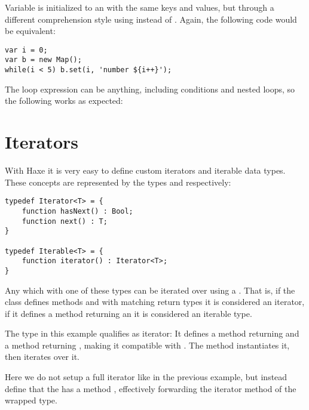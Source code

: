 Variable  is initialized to an  with the same keys and values, but through a different comprehension style using  instead of . Again, the following code would be equivalent:

\begin{lstlisting}
var i = 0;
var b = new Map();
while(i < 5) b.set(i, 'number ${i++}');
\end{lstlisting}

The loop expression can be anything, including conditions and nested loops, so the following works as expected:



\section{Iterators}
\label{lf-iterators}

With Haxe it is very easy to define custom iterators and iterable data types. These concepts are represented by the types  and  respectively:

\begin{lstlisting}
typedef Iterator<T> = {
	function hasNext() : Bool;
	function next() : T;
}

typedef Iterable<T> = {
	function iterator() : Iterator<T>;
}
\end{lstlisting}

Any  which  with one of these types can be iterated over using a . That is, if the class defines methods  and  with matching return types it is considered an iterator, if it defines a method  returning an  it is considered an iterable type.


The type  in this example qualifies as iterator: It defines a method  returning  and a method  returning , making it compatible with . The  method instantiates it, then iterates over it.


Here we do not setup a full iterator like in the previous example, but instead define that the  has a method , effectively forwarding the iterator method of the wrapped  type.

